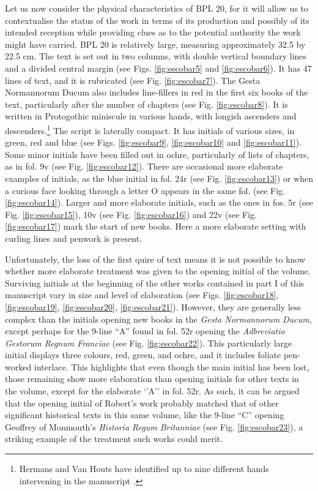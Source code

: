 \begin{paper}
Let us now consider the physical characteristics of BPL 20, for it will
allow us to contextualise the status of the work in terms of its
production and possibly of its intended reception while providing clues
as to the potential authority the work might have carried. BPL 20 is
relatively large, measuring approximately 32.5 by 22.5 cm. The text is
set out in two columns, with double vertical boundary lines and a
divided central margin (see Figs. \ref{fig:escobar5} and \ref{fig:escobar6}). It has 47 lines of text, and
it is rubricated (see Fig. \ref{fig:escobar7}). The Gesta Normannorum Ducum also includes
line-fillers in red in the first six books of the text, particularly
after the number of chapters (see Fig. \ref{fig:escobar8}). It is written in Protogothic
miniscule in various hands, with longish ascenders and
descenders.\footnote{Hermans and Van Houts have identified up to nine
  different hands intervening in the manuscript \citep[80]{hermans_history_1983}.} The script is laterally compact. It has initials of
various sizes, in green, red and blue (see Figs. \ref{fig:escobar9}, \ref{fig:escobar10} and \ref{fig:escobar11}). Some
minor initials have been filled out in ochre, particularly of lists of
chapters, as in fol. 9v (see Fig. \ref{fig:escobar12}). There are occasional more
elaborate examples of initials, as the blue initial in fol. 24r (see
Fig. \ref{fig:escobar13}) or when a curious face looking through a letter O appears in
the same fol. (see Fig. \ref{fig:escobar14}). Larger and more elaborate initials, such as
the ones in fos. 5r (see Fig. \ref{fig:escobar15}), 10v (see Fig. \ref{fig:escobar16}) and 22v (see Fig.
\ref{fig:escobar17}) mark the start of new books. Here a more elaborate setting with
curling lines and penwork is present.

Unfortunately, the loss of the first quire of text means it is not
possible to know whether more elaborate treatment was given to the
opening initial of the volume. Surviving initials at the beginning of
the other works contained in part I of this manuscript vary in size and
level of elaboration (see Figs. \ref{fig:escobar18}, \ref{fig:escobar19}, \ref{fig:escobar20}, \ref{fig:escobar21}). However, they are generally
less complex than the initials opening new books in the \emph{Gesta
Normannorum Ducum}, except perhaps for the 9-line ``A'' found in fol. 52r
opening the \emph{Adbreviatio Gestorum Regnum Franciae} (see Fig. \ref{fig:escobar22}).
This particularly large initial displays three colours, red, green, and
ochre, and it includes foliate pen-worked interlace. This highlights
that even though the main initial has been lost, those remaining show
more elaboration than opening initials for other texts in the volume,
except for the elaborate `'A'' in fol. 52r. As such, it can be argued that
the opening initial of Robert's work probably matched that of other
significant historical texts in this same volume, like the 9-line ``C''
opening Geoffrey of Monmouth's \emph{Historia Regum Britanniae} (see
Fig. \ref{fig:escobar23}), a striking example of the treatment such works could merit.


\end{paper}
